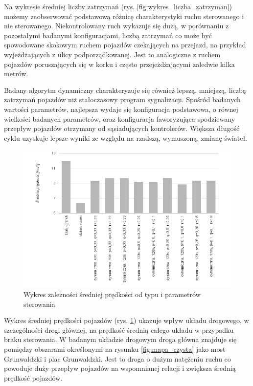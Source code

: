 Na wykresie średniej liczby zatrzymań (rys. \ref{fig:wykres_liczba_zatrzyman}) możemy zaobserwować podstawową różnicę charakterystyki ruchu sterowanego i nie sterowanego.
Niekontrolowany ruch wykazuje się dużą, w porównaniu z pozostałymi badanymi konfiguracjami, liczbą zatrzymań co może być spowodowane skokowym ruchem pojazdów czekających na przejazd, na przykład wyjeżdżających z ulicy podporządkowanej. Jest to analogiczne z ruchem pojazdów poruszających się w korku i często przejeżdżającymi zaledwie kilka metrów.

Badany algorytm dynamiczny charakteryzuje się również lepszą, mniejszą, liczbą zatrzymań pojazdów niż stałoczasowy program sygnalizacji.
Spośród badanych wartości parametrów, najlepsza wydaje się konfiguracja podstawowa, o równej wielkości badanych parametrów, oraz konfiguracja faworyzująca spodziewany przepływ pojazdów otrzymany od sąsiadujących kontrolerów. Większa długość cyklu uzyskuje lepsze wyniki ze względu na rzadszą, wymuszoną, zmianę świateł.

\FloatBarrier
\begin{figure}[h]
    \centering
    \includegraphics[width=1.0\textwidth]{images/wykres_predkosc.png}
    \caption{Wykres zależności średniej prędkości od typu i parametrów sterowania}
    \label{fig:wykres_predkosc}
\end{figure}
\FloatBarrier

Wykres średniej prędkości pojazdów (rys. \ref{fig:wykres_predkosc}) ukazuje wpływ układu drogowego, w szczególności drogi głównej, na prędkość średnią całego układu w przypadku braku sterowania. W badanym układzie drogowym droga główna znajduje się pomiędzy obszarami określonymi na rysunku \ref{fig:mapa_czysta} jako most Grunwaldzki i plac Grunwaldzki. Jest to droga o dużym natężeniu ruchu co powoduje duży przepływ pojazdów na wspomnianej relacji i zwiększa średnią prędkość pojazdów.

